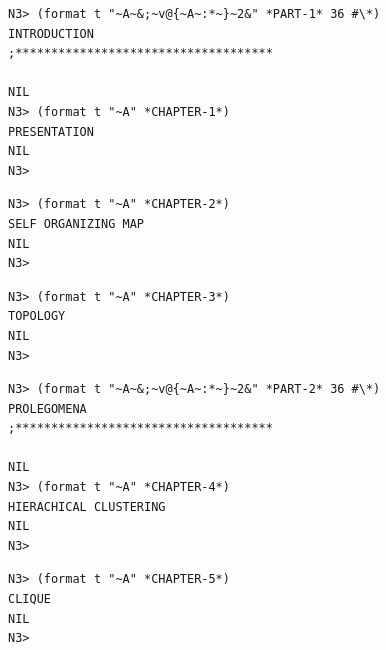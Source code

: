 \documentclass{article}
\begin{document}
\begin{spacing}{0.1}
\renewcommand*\contentsname{Contents}
\tableofcontents
\end{spacing}

\bigskip
\bigskip
\renewcommand*\listfigurename{List of figures}
\listoffigures


\bigskip
\bigskip
\bigskip

\begin{lstlisting}[language=sectitle]
N3> (format t "~A~&;~v@{~A~:*~}~2&" *PART-1* 36 #\*)
INTRODUCTION
;************************************

NIL
N3> (format t "~A" *CHAPTER-1*)
PRESENTATION
NIL
N3> 
\end{lstlisting}
{}

\bigskip

\bigskip
\bigskip

\begin{lstlisting}[language=sectitle]
N3> (format t "~A" *CHAPTER-2*)
SELF ORGANIZING MAP
NIL
N3> 
\end{lstlisting}

\bigskip

\newpage

\begin{lstlisting}[language=sectitle]
N3> (format t "~A" *CHAPTER-3*)
TOPOLOGY
NIL
N3> 
\end{lstlisting}
\label{topology}

\bigskip

\bigskip
\bigskip

\begin{lstlisting}[language=sectitle]
N3> (format t "~A~&;~v@{~A~:*~}~2&" *PART-2* 36 #\*)
PROLEGOMENA
;************************************

NIL
N3> (format t "~A" *CHAPTER-4*)
HIERACHICAL CLUSTERING
NIL
N3> 
\end{lstlisting}
{}

\bigskip

\bigskip
\bigskip

\begin{lstlisting}[language=sectitle]
N3> (format t "~A" *CHAPTER-5*)
CLIQUE
NIL
N3> 
\end{lstlisting}
\end{document}
